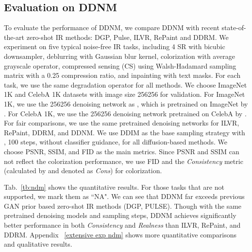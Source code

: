 \documentclass{article} \usepackage{iclr2023_conference,times}
\begin{document}
\subsection{Evaluation on DDNM}
To evaluate the performance of DDNM, we compare DDNM with recent state-of-the-art zero-shot IR methods: DGP\citep{chen2020deep}, Pulse\citep{menon2020pulse}, ILVR\citep{choi2021ilvr}, RePaint\citep{lugmayr2022repaint} and DDRM\citep{kawar2022denoising}. We experiment on five typical noise-free IR tasks, including 4 SR with bicubic downsampler, deblurring with Gaussian blur kernel, colorization with average grayscale operator, compressed sensing (CS) using Walsh-Hadamard sampling matrix with a 0.25 compression ratio, and inpainting with text masks. For each task, we use the same degradation operator for all methods. We choose ImageNet 1K and CelebA 1K datasets with image size 256256 for validation. For ImageNet 1K, we use the 256256 denoising network as , which is pretrained on ImageNet by \cite{dhariwal2021diffusion}. For CelebA 1K, we use the 256256 denoising network pretrained on CelebA by \cite{lugmayr2022repaint}. For fair comparisons, we use the same pretrained denoising networks for ILVR, RePaint, DDRM, and DDNM. We use DDIM as the base sampling strategy with , 100 steps, without classifier guidance, for all diffusion-based methods. We choose PSNR, SSIM, and FID \citep{fid} as the main metrics. Since PSNR and SSIM can not reflect the colorization performance, we use FID and the \textit{Consistency} metric (calculated by  and denoted as \textit{Cons}) for colorization.


Tab.~\ref{tb:ndm} shows the quantitative results. For those tasks that are not supported, we mark them as ``NA". We can see that DDNM far exceeds previous GAN prior based zero-shot IR methods (DGP, PULSE). Though with the same pretrained denoising models and sampling steps, DDNM achieves significantly better performance in both \textit{Consistency} and \textit{Realness} than ILVR, RePaint, and DDRM. Appendix ~\ref{extensive exp ndm} shows more quantitative comparisons and qualitative results.  
\end{document}
